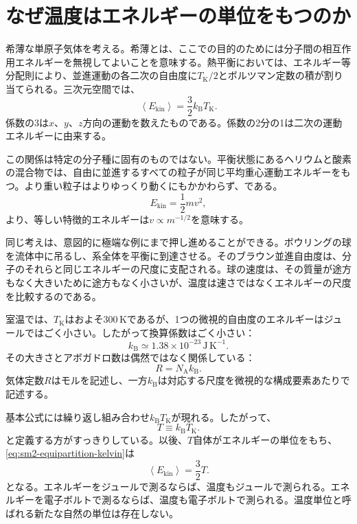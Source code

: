 \section{なぜ温度はエネルギーの単位をもつのか}

希薄な単原子気体を考える。希薄とは、ここでの目的のためには分子間の相互作用エネルギーを無視してよいことを意味する。熱平衡においては、エネルギー等分配則により、並進運動の各二次の自由度に\(T_{\mathrm K}/2\)とボルツマン定数の積が割り当てられる。三次元空間では、\begin{equation}
 \left\langle E_{\mathrm{kin}}\right\rangle
 =\frac{3}{2}k_{\mathrm B}T_{\mathrm K}.
 \label{eq:sm2-equipartition-kelvin}
\end{equation} 係数の3は\(x\)、\(y\)、\(z\)方向の運動を数えたものである。係数の2分の1は二次の運動エネルギーに由来する。

この関係は特定の分子種に固有のものではない。平衡状態にあるヘリウムと酸素の混合物では、自由に並進するすべての粒子が同じ平均重心運動エネルギーをもつ。より重い粒子はよりゆっくり動くにもかかわらず、である。
\begin{equation}
 E_{\mathrm{kin}}=\frac{1}{2}mv^2,
\end{equation}
より、等しい特徴的エネルギーは\(v\propto m^{-1/2}\)を意味する。

同じ考えは、意図的に極端な例にまで押し進めることができる。ボウリングの球を流体中に吊るし、系全体を平衡に到達させる。そのブラウン並進自由度は、分子のそれらと同じエネルギーの尺度に支配される。球の速度は、その質量が途方もなく大きいために途方もなく小さいが、温度は速さではなくエネルギーの尺度を比較するのである。

室温では、\(T_{\mathrm K}\)はおよそ\(300\,\mathrm K\)であるが、1つの微視的自由度のエネルギーはジュールではごく小さい。したがって換算係数はごく小さい：
\begin{equation}
 k_{\mathrm B}\simeq 1.38\times10^{-23}\,
 \mathrm{J\,K^{-1}}.
 \label{eq:sm2-boltzmann-value}
\end{equation}
その大きさとアボガドロ数は偶然ではなく関係している：
\begin{equation}
 R=N_{\mathrm A}k_{\mathrm B}.
\end{equation}
気体定数\(R\)はモルを記述し、一方\(k_{\mathrm B}\)は対応する尺度を微視的な構成要素あたりで記述する。

基本公式には繰り返し組み合わせ\(k_{\mathrm B}T_{\mathrm K}\)が現れる。したがって、
\begin{equation}
 T\equiv k_{\mathrm B}T_{\mathrm K}.
 \label{eq:sm2-energy-temperature}
\end{equation}
と定義する方がすっきりしている。以後、\(T\)自体がエネルギーの単位をもち、\eqref{eq:sm2-equipartition-kelvin}は
\begin{equation}
 \left\langle E_{\mathrm{kin}}\right\rangle=\frac{3}{2}T.
 \label{eq:sm2-equipartition-natural}
\end{equation}
となる。エネルギーをジュールで測るならば、温度もジュールで測られる。エネルギーを電子ボルトで測るならば、温度も電子ボルトで測られる。温度単位と呼ばれる新たな自然の単位は存在しない。

